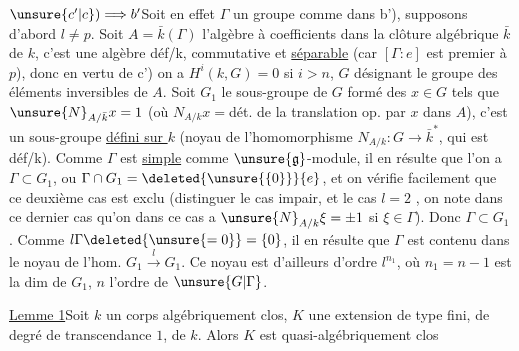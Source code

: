 $\unsure{c'|c})\Longrightarrow b'$\quad Soit en effet $\Gamma$ un groupe comme dans b'), supposons d'abord $l\ne p$.
Soit $A=\bar k(\Gamma)$ l'algèbre  à coefficients dans la clôture algébrique $\bar k$ de $k$,  c'est une algèbre déf/k, commutative et  \uline{séparable} (car $[\Gamma:e]$ est premier à $p$), donc en vertu de c') on a $H^i(k,G)=0$ si $i>n$, $G$ désignant le groupe des éléments inversibles de $A$.
Soit $G_1$ le sous-groupe de $G$ formé des $x\in G$ tels que $\unsure{N}_{A/\bar k}x=1$ (où  $N_{A/k}x={}$dét. de la translation op. par $x$ dans $A$), c'est un sous-groupe \uline{défini sur $k$} (noyau de l'homomorphisme $N_{A/k}:G\longrightarrow\bar k^*$, qui est déf/k).
Comme $\Gamma$ est \uline{simple} comme $\unsure{\mathfrak g}$-module,  il en résulte que  l'on a $\Gamma\subset G_1$, ou $\Gamma\cap G_1=\deleted{\unsure{\{0\}}}\{e\}$, et on vérifie facilement que ce deuxième cas est exclu (distinguer le cas   impair, et le cas $l=2$ \deleted{$\unsure{;} $}, on note dans ce dernier cas qu'on dans ce cas a $\unsure{N}_{A/k}\xi=\pm1$ si $\xi\in\Gamma$).
Donc $\Gamma\subset G_1$. Comme $l\Gamma\deleted{\unsure{=0}}=\{0\}$, il en résulte que $\Gamma$ est contenu dans le noyau de l'hom. $G_1\xrightarrow{l}G_1$.
Ce noyau est d'ailleurs d'ordre $l^{n_1}$, où $n_1=n-1$ est la dim de $G_1$,  $n$ l'ordre de $\unsure{G|\Gamma}$.



\uline{Lemme 1}\quad Soit $k$ un corps algébriquement clos, $K$ une extension de type fini, de degré de transcendance $1$, de $k$. Alors $K$ est  quasi-algébriquement clos

